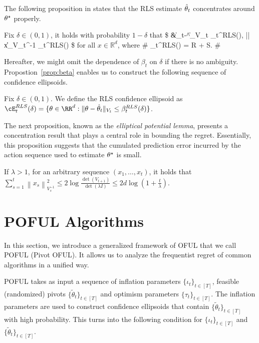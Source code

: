 The following proposition in \cite{abbasi2011improved} states that the RLS estimate $\hat{\theta}_t$  concentrates around $\theta^\star$ properly.
\begin{proposition}
	\label{prop:beta}
	Fix $\delta  \in (0,1)$, it holds with probability $1-\delta$ that
	\$
	&\left\|\widehat{\theta}_t-\theta^{\star}\right\|_{V_t} \leq \beta_t^{RLS}(\delta), \quad \left|\right| \leq\|x\|_{V_t^{-1}} \beta_t^{RLS}(\delta)
	\$
	for all $x\in \mathbb{R}^d$,   where
	\#
	\beta_t^{RLS}(\delta) = R +\sqrt{\lambda} S.
	\#
\end{proposition}
Hereafter, we might omit the dependence of $\beta_t$ on $\delta$ if there is no ambiguity. Propostion~\ref{prop:beta} enables us to construct the following sequence of confidence ellipsoids.
\begin{definition}
	\label{def:rls}
	Fix $\delta\in (0,1)$. We define the RLS confidence ellipsoid as	$
	\cE_t^{RLS}(\delta)  = \{\theta \in \RR^d: \|\theta - \hparam_t\|_{V_t}\leq \beta_t^{RLS}(\delta) \}$.
\end{definition}


The next proposition, known as the \emph{elliptical potential lemma}, presents a concentration result that plays a central role in bounding the regret. Essentially, this proposition suggests that the cumulated prediction error incurred by the action sequence used to estimate $\theta^\star$ is small.
\begin{proposition} \label{prop:potential}
	If $\lambda >1$, for an arbitrary sequence $(x_1,\dots,x_t)$, it holds that
	$
	\sum_{s=1}^t\left\|x_s\right\|_{V_s^{-1}}^2 \leq 2 \log \frac{\operatorname{det}\left(V_{t+1}\right)}{\operatorname{det}(\lambda I)} \leq 2 d \log \left(1+\frac{t}{\lambda}\right).
	$

\end{proposition}


\section{POFUL Algorithms}
\label{sec:POFUL}
In this section, we introduce a generalized framework of OFUL that we call POFUL (Pivot OFUL). It allows us to analyze the frequentist regret of common algorithms in a unified way. 

POFUL takes as input a sequence of inflation parameters $\{\iota_t\}_{t\in [T]}$,  feasible (randomized) pivots $\{\tilde{\theta}_t\}_{t\in[T]}$ and optimism parameters $\{\tau_t\}_{t\in [T]}$. The inflation parameters are used to construct confidence ellipsoids that contain $\{\tilde{\theta}_t\}_{t\in[T]}$ with high probability. This turns into the following condition for $\{\iota_t\}_{t\in [T]}$ and $\{\tilde{\theta}_t\}_{t\in[T]}$.

